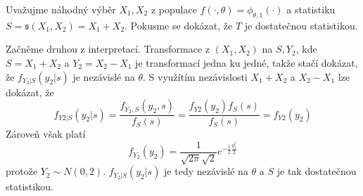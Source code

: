\begin{example}
Uvažujme náhodný výběr $X_1, X_2$ z populace $f(\cdot, \theta) = \phi_{\theta, 1}(\cdot)$ a statistiku $S = \mathfrak{s}(X_1, X_2) = X_1 + X_2$. Pokusme se dokázat, že $T$ je dostatečnou statistikou.

Začněme druhou z interpretací. Transformace z $(X_1, X_2)$ na $S, Y_2$, kde $S = X_1 + X_2$ a $Y_2 = X_2 - X_1$ je transformací jedna ku jedné, takže stačí dokázat, že $f_{Y_2|S}(y_2|s)$ je nezávislé na $\theta$. S využítím nezávislosti $X_1 + X_2$ a $X_2 - X_1$ lze dokázat, že
\begin{equation*}
f_{Y2|S}(y_2|s) = \frac{f_{Y_2, S}(y_2, s)}{f_S(s)} = \frac{f_{Y2}(y_2)f_S(s)}{f_S(s)} = f_{Y2}(y_2)
\end{equation*}
Zároveň však platí
\begin{equation*}
f_{Y_2}(y_2) = \frac{1}{\sqrt{2 \pi} \sqrt{2}}e^{-\frac{1}{2}\frac{y_2^2}{2}}
\end{equation*}
protože $Y_2 \sim N(0, 2)$. $f_{Y_2|S}(y_2|s)$ je tedy nezávislé na $\theta$ a $S$ je tak dostatečnou statistikou.


\end{example}
